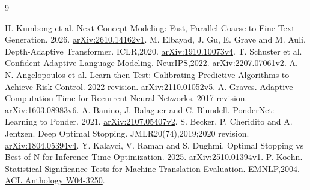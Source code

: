 \documentclass[11pt]{article}
\begin{document}
\begin{thebibliography}{9}
\footnotesize\raggedright
{} H. Kumbong et al. Next-Concept Modeling: Fast, Parallel Coarse-to-Fine Text Generation. 2026. \href{https://arxiv.org/abs/2610.14162v1}{arXiv:2610.14162v1}.
 M. Elbayad, J. Gu, E. Grave and M. Auli. Depth-Adaptive Transformer. ICLR,2020. \href{https://arxiv.org/abs/1910.10073v4}{arXiv:1910.10073v4}.
 T. Schuster et al. Confident Adaptive Language Modeling. NeurIPS,2022. \href{https://arxiv.org/abs/2207.07061v2}{arXiv:2207.07061v2}.
 A. N. Angelopoulos et al. Learn then Test: Calibrating Predictive Algorithms to Achieve Risk Control. 2022 revision. \href{https://arxiv.org/abs/2110.01052v5}{arXiv:2110.01052v5}.
 A. Graves. Adaptive Computation Time for Recurrent Neural Networks. 2017 revision. \href{https://arxiv.org/abs/1603.08983v6}{arXiv:1603.08983v6}.
 A. Banino, J. Balaguer and C. Blundell. PonderNet: Learning to Ponder. 2021. \href{https://arxiv.org/abs/2107.05407v2}{arXiv:2107.05407v2}.
 S. Becker, P. Cheridito and A. Jentzen. Deep Optimal Stopping. JMLR20(74),2019;2020 revision. \href{https://arxiv.org/abs/1804.05394v4}{arXiv:1804.05394v4}.
 Y. Kalayci, V. Raman and S. Dughmi. Optimal Stopping vs Best-of-N for Inference Time Optimization. 2025. \href{https://arxiv.org/abs/2510.01394v1}{arXiv:2510.01394v1}.
 P. Koehn. Statistical Significance Tests for Machine Translation Evaluation. EMNLP,2004. \href{https://aclanthology.org/W04-3250/}{ACL Anthology W04-3250}.
\end{thebibliography}
\end{document}
